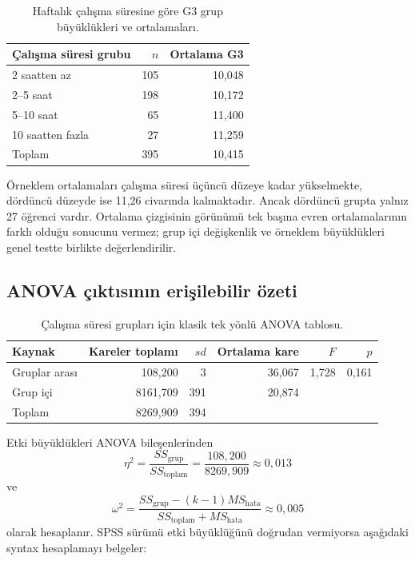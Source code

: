 \begin{table}[htbp]
\centering
\caption{Haftalık çalışma süresine göre G3 grup büyüklükleri ve ortalamaları.}
\begin{tabular}{@{}p{}rr@{}}
\toprule
Çalışma süresi grubu & $n$ & Ortalama G3 \\
\midrule
2 saatten az & 105 & 10,048 \\
2--5 saat & 198 & 10,172 \\
5--10 saat & 65 & 11,400 \\
10 saatten fazla & 27 & 11,259 \\
\midrule
Toplam & 395 & 10,415 \\
\bottomrule
\end{tabular}
\end{table}

Örneklem ortalamaları çalışma süresi üçüncü düzeye kadar yükselmekte, dördüncü
düzeyde ise 11,26 civarında kalmaktadır. Ancak dördüncü grupta yalnız 27
öğrenci vardır. Ortalama çizgisinin görünümü tek başına evren ortalamalarının
farklı olduğu sonucunu vermez; grup içi değişkenlik ve örneklem büyüklükleri
genel testte birlikte değerlendirilir.

\subsection{ANOVA çıktısının erişilebilir özeti}

\begin{table}[htbp]
\centering
\caption{Çalışma süresi grupları için klasik tek yönlü ANOVA tablosu.}
\small
\begin{tabular}{@{}lrrrrr@{}}
\toprule
Kaynak & Kareler toplamı & $sd$ & Ortalama kare & $F$ & $p$ \\
\midrule
Gruplar arası & 108,200 & 3 & 36,067 & 1,728 & 0,161 \\
Grup içi & 8161,709 & 391 & 20,874 & & \\
Toplam & 8269,909 & 394 & & & \\
\bottomrule
\end{tabular}
\end{table}

Etki büyüklükleri ANOVA bileşenlerinden
\[
\eta^2=\frac{SS_{\mathrm{grup}}}{SS_{\mathrm{toplam}}}
=\frac{108{,}200}{8269{,}909}\approx0{,}013
\]
ve
\[
\omega^2=
\frac{SS_{\mathrm{grup}}-(k-1)MS_{\mathrm{hata}}}
{SS_{\mathrm{toplam}}+MS_{\mathrm{hata}}}
\approx0{,}005
\]
olarak hesaplanır. SPSS sürümü etki büyüklüğünü doğrudan vermiyorsa aşağıdaki
syntax hesaplamayı belgeler:

